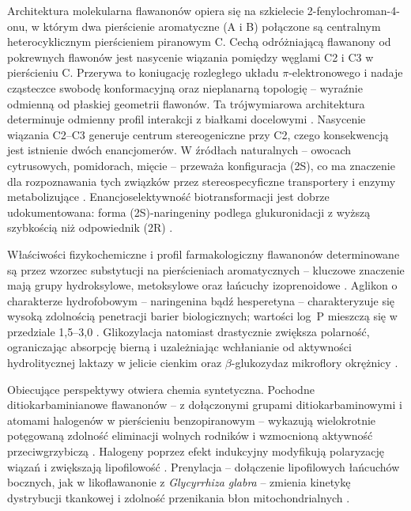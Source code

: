 \documentclass[12pt,a4paper]{article}
\begin{document}
Architektura molekularna flawanonów opiera się na szkielecie 2-fenylochroman-4-onu, w którym dwa pierścienie aromatyczne (A i B) połączone są centralnym heterocyklicznym pierścieniem piranowym C. Cechą odróżniającą flawanony od pokrewnych flawonów jest nasycenie wiązania pomiędzy węglami C2 i C3 w pierścieniu C. Przerywa to koniugację rozległego układu $\pi$-elektronowego i nadaje cząsteczce swobodę konformacyjną oraz nieplanarną topologię -- wyraźnie odmienną od płaskiej geometrii flawonów. Ta trójwymiarowa architektura determinuje odmienny profil interakcji z białkami docelowymi \cite{najmanova2019}. Nasycenie wiązania C2--C3 generuje centrum stereogeniczne przy C2, czego konsekwencją jest istnienie dwóch enancjomerów. W źródłach naturalnych -- owocach cytrusowych, pomidorach, mięcie -- przeważa konfiguracja (2S), co ma znaczenie dla rozpoznawania tych związków przez stereospecyficzne transportery i enzymy metabolizujące \cite{najmanova2019}. Enancjoselektywność biotransformacji jest dobrze udokumentowana: forma (2S)-naringeniny podlega glukuronidacji z wyższą szybkością niż odpowiednik (2R) \cite{williamson2018}.

Właściwości fizykochemiczne i profil farmakologiczny flawanonów determinowane są przez wzorzec substytucji na pierścieniach aromatycznych -- kluczowe znaczenie mają grupy hydroksylowe, metoksylowe oraz łańcuchy izoprenoidowe \cite{santos2020}. Aglikon o charakterze hydrofobowym -- naringenina bądź hesperetyna -- charakteryzuje się wysoką zdolnością penetracji barier biologicznych; wartości log~P mieszczą się w przedziale 1,5--3,0 \cite{najmanova2019}. Glikozylacja natomiast drastycznie zwiększa polarność, ograniczając absorpcję bierną i uzależniając wchłanianie od aktywności hydrolitycznej laktazy w jelicie cienkim oraz $\beta$-glukozydaz mikroflory okrężnicy \cite{williamson2018}.

Obiecujące perspektywy otwiera chemia syntetyczna. Pochodne ditiokarbaminianowe flawanonów -- z dołączonymi grupami ditiokarbaminowymi i atomami halogenów w pierścieniu benzopiranowym -- wykazują wielokrotnie potęgowaną zdolność eliminacji wolnych rodników i wzmocnioną aktywność przeciwgrzybiczą \cite{birsa2024a, birsa2024b}. Halogeny poprzez efekt indukcyjny modyfikują polaryzację wiązań i zwiększają lipofilowość \cite{birsa2024a}. Prenylacja -- dołączenie lipofilowych łańcuchów bocznych, jak w likoflawanonie z \textit{Glycyrrhiza glabra} -- zmienia kinetykę dystrybucji tkankowej i zdolność przenikania błon mitochondrialnych \cite{frattaruolo2024}.
\end{document}
